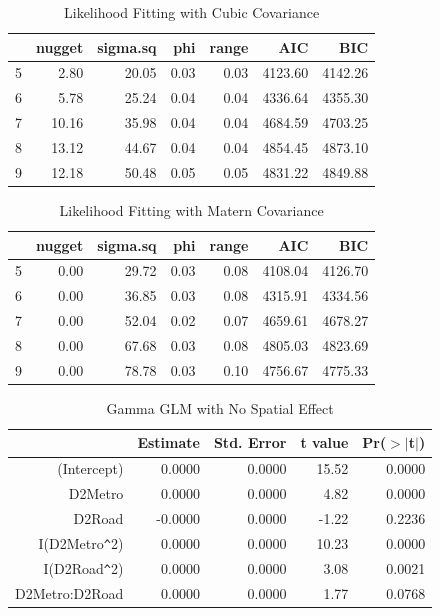 \documentclass[hidelinks,12pt]{article}
\begin{document}
	\begin{table}[!ht]
		\centering
		\caption{Likelihood Fitting with Cubic Covariance \label{tbl:likcub}}
		\begin{tabular}{rrrrrrr}
			\hline
			& nugget & sigma.sq & phi & range & AIC & BIC \\ 
			\hline
			5 & 2.80 & 20.05 & 0.03 & 0.03 & 4123.60 & 4142.26 \\ 
			6 & 5.78 & 25.24 & 0.04 & 0.04 & 4336.64 & 4355.30 \\ 
			7 & 10.16 & 35.98 & 0.04 & 0.04 & 4684.59 & 4703.25 \\ 
			8 & 13.12 & 44.67 & 0.04 & 0.04 & 4854.45 & 4873.10 \\ 
			9 & 12.18 & 50.48 & 0.05 & 0.05 & 4831.22 & 4849.88 \\ 
			\hline
		\end{tabular}
	\end{table}
	\begin{table}[!ht]
		\centering
		\caption{Likelihood Fitting with Matern Covariance \label{tbl:likmat}}
		\begin{tabular}{rrrrrrr}
			\hline
			& nugget & sigma.sq & phi & range & AIC & BIC \\ 
			\hline
			5 & 0.00 & 29.72 & 0.03 & 0.08 & 4108.04 & 4126.70 \\ 
			6 & 0.00 & 36.85 & 0.03 & 0.08 & 4315.91 & 4334.56 \\ 
			7 & 0.00 & 52.04 & 0.02 & 0.07 & 4659.61 & 4678.27 \\ 
			8 & 0.00 & 67.68 & 0.03 & 0.08 & 4805.03 & 4823.69 \\ 
			9 & 0.00 & 78.78 & 0.03 & 0.10 & 4756.67 & 4775.33 \\ 
			\hline
		\end{tabular}
	\end{table}
	\clearpage
	\begin{table}[!ht]
		\centering
		\caption{Gamma GLM with No Spatial Effect \label{tbl:gamglm}}
		\begin{tabular}{rrrrr}
			\hline
			& Estimate & Std. Error & t value & Pr($>$$|$t$|$) \\ 
			\hline
			(Intercept) & 0.0000 & 0.0000 & 15.52 & 0.0000 \\ 
			D2Metro & 0.0000 & 0.0000 & 4.82 & 0.0000 \\ 
			D2Road & -0.0000 & 0.0000 & -1.22 & 0.2236 \\ 
			I(D2Metro\verb|^|2) & 0.0000 & 0.0000 & 10.23 & 0.0000 \\ 
			I(D2Road\verb|^|2) & 0.0000 & 0.0000 & 3.08 & 0.0021 \\ 
			D2Metro:D2Road & 0.0000 & 0.0000 & 1.77 & 0.0768 \\ 
			\hline
		\end{tabular}
	\end{table}
\end{document}
